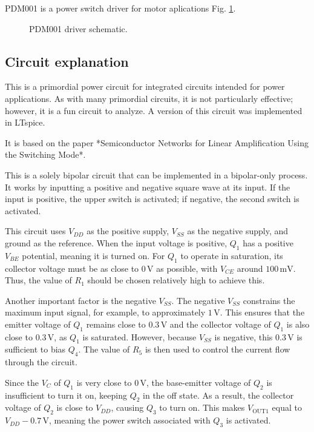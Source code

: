 \documentclass[12pt]{article}
\begin{document}
PDM001 is a power switch driver for motor aplications Fig. \ref{PDM001}. 

\begin{figure}[H]
        \centering
        
        \caption{PDM001 driver schematic.}
        \label{PDM001}
\end{figure}


\subsection{Circuit explanation}

This is a primordial power circuit for integrated circuits intended for power applications. As with many primordial circuits, it is not particularly effective; however, it is a fun circuit to analyze.  
A version of this circuit was implemented in LTspice.  

It is based on the paper *Semiconductor Networks for Linear Amplification Using the Switching Mode*.  

This is a solely bipolar circuit that can be implemented in a bipolar-only process. It works by inputting a positive and negative square wave at its input. If the input is positive, the upper switch is activated; if negative, the second switch is activated.  

This circuit uses $V_{DD}$ as the positive supply, $V_{SS}$ as the negative supply, and ground as the reference. When the input voltage is positive, $Q_1$ has a positive $V_{BE}$ potential, meaning it is turned on. For $Q_1$ to operate in saturation, its collector voltage must be as close to $0 \, \text{V}$ as possible, with $V_{CE}$ around $100 \, \text{mV}$. Thus, the value of $R_1$ should be chosen relatively high to achieve this.  

Another important factor is the negative $V_{SS}$. The negative $V_{SS}$ constrains the maximum input signal, for example, to approximately $1 \, \text{V}$. This ensures that the emitter voltage of $Q_1$ remains close to $0.3 \, \text{V}$ and the collector voltage of $Q_1$ is also close to $0.3 \, \text{V}$, as $Q_1$ is saturated. However, because $V_{SS}$ is negative, this $0.3 \, \text{V}$ is sufficient to bias $Q_4$. The value of $R_5$ is then used to control the current flow through the circuit.  

Since the $V_C$ of $Q_1$ is very close to $0 \, \text{V}$, the base-emitter voltage of $Q_2$ is insufficient to turn it on, keeping $Q_2$ in the off state. As a result, the collector voltage of $Q_2$ is close to $V_{DD}$, causing $Q_3$ to turn on. This makes $V_{\text{OUT1}}$ equal to $V_{DD} - 0.7 \, \text{V}$, meaning the power switch associated with $Q_3$ is activated.  
\end{document}

